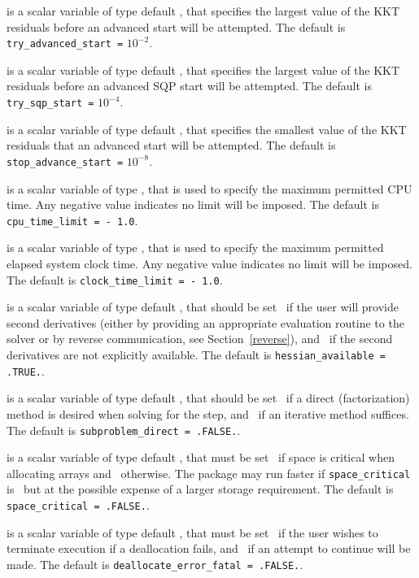 \documentclass{galahad}
\begin{document}
\begin{description}
 is a scalar variable of type default \realdp, that 
specifies the largest value of the KKT residuals before an advanced start 
will be attempted.
The default is {\tt try\_advanced\_start =} $10^{-2}$.

 is a scalar variable of type default \realdp, that 
specifies the largest value of the KKT residuals before an advanced SQP start 
will be attempted.
The default is {\tt try\_sqp\_start =} $10^{-4}$.

 is a scalar variable of type default \realdp, that 
specifies the smallest value of the KKT residuals that an advanced start 
will be attempted.
The default is {\tt stop\_advance\_start =} $10^{-8}$.

 is a scalar variable of type \realdp,
that is used to specify the maximum permitted CPU time. Any negative
value indicates no limit will be imposed. The default is
{\tt cpu\_time\_limit = - 1.0}.

 is a scalar variable of type \realdp,
that is used to specify the maximum permitted elapsed system clock time.
Any negative value indicates no limit will be imposed. The default is
{\tt clock\_time\_limit = - 1.0}.

is a scalar variable of type default \logical,
that should be set \true\ if the user will provide second derivatives
(either by providing an appropriate evaluation routine to the solver
or by reverse communication, see Section~\ref{reverse}), and
\false\ if the second derivatives are not explicitly available.
The default is {\tt hessian\_available = .TRUE.}.

is a scalar variable of type default \logical,
that should be set \true\ if a direct (factorization) method is
desired when solving for the step, and \false\ if an iterative
method suffices.
The default is {\tt subproblem\_direct = .FALSE.}.

 is a scalar variable of type default \logical,
that must be set \true\ if space is critical when allocating arrays
and  \false\ otherwise. The package may run faster if
{\tt space\_critical} is \false\ but at the possible expense of a larger
storage requirement. The default is {\tt space\_critical = .FALSE.}.

 is a scalar variable of type default \logical,
that must be set \true\ if the user wishes to terminate execution if
a deallocation  fails, and \false\ if an attempt to continue
will be made. The default is {\tt deallocate\_error\_fatal = .FALSE.}.


\end{description}
\end{document}
